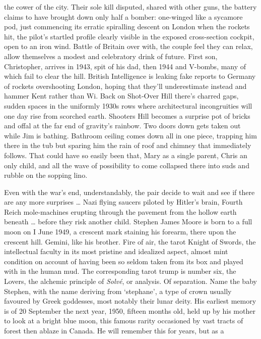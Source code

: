\documentclass[
]{article}
\begin{document}
the cower of the city. Their sole kill disputed, shared with other guns,
the battery claims to have brought down only half a bomber: one-winged
like a sycamore pod, just commencing its erratic spiralling descent on
London when the rockets hit, the pilot's startled profile clearly
visible in the exposed cross-section cockpit, open to an iron wind.
Battle of Britain over with, the couple feel they can relax, allow
themselves a modest and celebratory drink of future. First son,
Christopher, arrives in 1943, spit of his dad, then 1944 and V-bombs,
many of which fail to clear the hill. British Intelligence is leaking
fake reports to Germany of rockets overshooting London, hoping that
they'll underestimate instead and hammer Kent rather than Wi. Back on
Shot-Over Hill there's charred gaps, sudden spaces in the uniformly
1930s rows where architectural incongruities will one day rise from
scorched earth. Shooters Hill becomes a surprise pot of bricks and offal
at the far end of gravity's rainbow. Two doors down gets taken out while
Jim is bathing. Bathroom ceiling comes down all in one piece, trapping
him there in the tub but sparing him the rain of roof and chimney that
immediately follows. That could have so easily been that, Mary as a
single parent, Chris an only child, and all the wave of possibility to
come collapsed there into suds and rubble on the sopping lino. \par
Even with the war's end, understandably, the pair decide to wait
and see if there are any more surprises \ldots{} Nazi flying saucers
piloted by Hitler's brain, Fourth Reich mole-machines erupting through
the pavement from the hollow earth beneath \ldots{} before they risk
another child. Stephen James Moore is born to a full moon on I June
1949, a crescent mark staining his forearm, there upon the crescent
hill. Gemini, like his brother. Fire of air, the tarot Knight of Swords,
the intellectual faculty in its most pristine and idealized aspect,
almost mint condition on account of having been so seldom taken from its
box and played with in the human mud. The corresponding tarot trump is
number six, the Lovers, the alchemic principle of \emph{Solvé}, or
analysis. Of separation. Name the baby Stephen, with the name deriving
from `stephane', a type of crown usually favoured by Greek goddesses,
most notably their lunar deity. His earliest memory is of 20 September
the next year, 1950, fifteen months old, held up by his mother to look
at a bright blue moon, this famous rarity occasioned by vast tracts of
forest then ablaze in Canada. He will remember this for years, but as a
\end{document}
